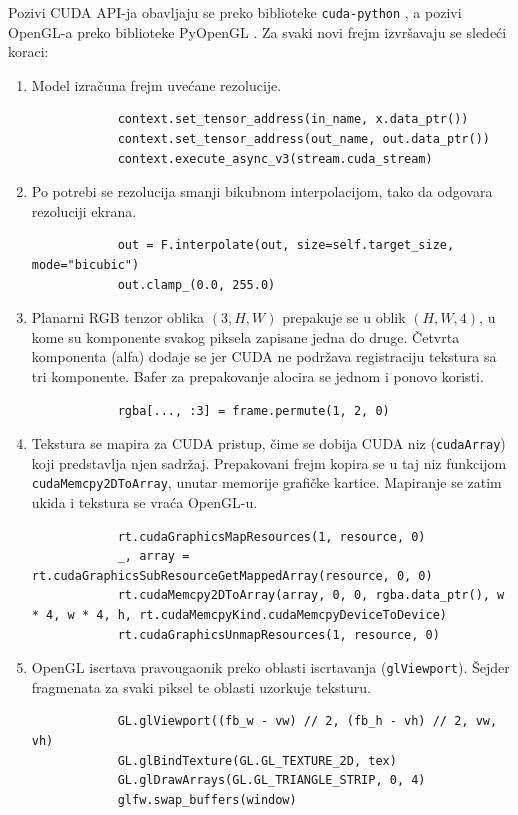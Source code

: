 \documentclass[12pt,a4paper]{article}
\begin{document}
Pozivi CUDA API-ja obavljaju se preko biblioteke \texttt{cuda-python} \cite{cudapython}, a pozivi OpenGL-a preko biblioteke PyOpenGL \cite{PyOpenGL}. Za svaki novi frejm izvršavaju se sledeći koraci:
\begin{enumerate}[itemsep=0pt]
	\item Model izračuna frejm uvećane rezolucije.
	\begin{verbatim}
			context.set_tensor_address(in_name, x.data_ptr())
			context.set_tensor_address(out_name, out.data_ptr())
			context.execute_async_v3(stream.cuda_stream)
		\end{verbatim}
	\item Po potrebi se rezolucija smanji bikubnom interpolacijom, tako da odgovara rezoluciji ekrana.
	\begin{verbatim}
			out = F.interpolate(out, size=self.target_size, mode="bicubic")
			out.clamp_(0.0, 255.0)
		\end{verbatim}
	\item Planarni RGB tenzor oblika $(3,H,W)$ prepakuje se u oblik $(H,W,4)$, u kome su komponente svakog piksela zapisane jedna do druge. Četvrta komponenta (alfa) dodaje se jer CUDA ne podržava registraciju tekstura sa tri komponente. Bafer za prepakovanje alocira se jednom i ponovo koristi.
	\begin{verbatim}
			rgba[..., :3] = frame.permute(1, 2, 0)
		\end{verbatim}
	\item Tekstura se mapira za CUDA pristup, čime se dobija CUDA niz (\texttt{cudaArray}) koji predstavlja njen sadržaj. Prepakovani frejm kopira se u taj niz funkcijom \texttt{cudaMemcpy2DToArray}, unutar memorije grafičke kartice. Mapiranje se zatim ukida i tekstura se vraća OpenGL-u.
	\begin{verbatim}
			rt.cudaGraphicsMapResources(1, resource, 0)
			_, array = rt.cudaGraphicsSubResourceGetMappedArray(resource, 0, 0)
			rt.cudaMemcpy2DToArray(array, 0, 0, rgba.data_ptr(), w * 4, w * 4, h, rt.cudaMemcpyKind.cudaMemcpyDeviceToDevice)
			rt.cudaGraphicsUnmapResources(1, resource, 0)
		\end{verbatim}
	\item OpenGL iscrtava pravougaonik preko oblasti iscrtavanja (\texttt{glViewport}). Šejder fragmenata za svaki piksel te oblasti uzorkuje teksturu.
	\begin{verbatim}
			GL.glViewport((fb_w - vw) // 2, (fb_h - vh) // 2, vw, vh)
			GL.glBindTexture(GL.GL_TEXTURE_2D, tex)
			GL.glDrawArrays(GL.GL_TRIANGLE_STRIP, 0, 4)
			glfw.swap_buffers(window)
		\end{verbatim}
\end{enumerate}
\end{document}
